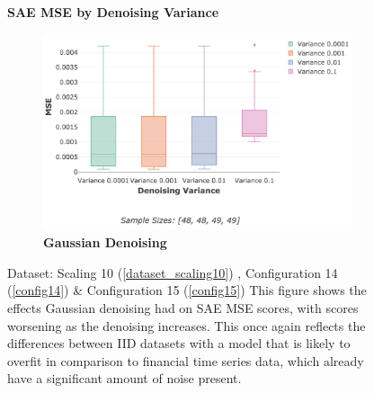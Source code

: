 \documentclass[a4paper,11pt,oneside]{article}
\theoremstyle{plain}
\theoremstyle{definition}
\begin{document}
	\begin{figure}[H]
	\centering
	\textbf{SAE MSE by Denoising Variance}
	\begin{subfigure}{.99\textwidth}
		\centering 
		\includegraphics[scale=0.305 ]{images/results/8_6_complexity/actual_mse_gaussian.png}
		\caption{\textbf{Gaussian Denoising} 
			\newline }
		\label{figure-actual_mse_gaussian}
	\end{subfigure}%
	\caption[SAE MSE by Denoising Variance]
	{Dataset: Scaling 10 (\ref{dataset_scaling10}) , Configuration 14 (\ref{config14}) \& Configuration 15 (\ref{config15})
		\newline This figure shows the effects Gaussian denoising had on SAE MSE scores, with scores worsening as the denoising increases. This once again reflects the differences between IID datasets with a model that is likely to overfit in comparison to financial time series data, which already have a significant amount of noise present.}
	\label{figure-results_mse_denoising}
	\end{figure}
\end{document}
